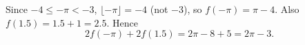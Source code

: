 Since $-4\le-\pi<-3$, $\lfloor-\pi\rfloor=-4$ (not $-3$), so $f(-\pi)=\pi-4$. Also $f(1.5)=1.5+1=2.5$. Hence
\[
2f(-\pi)+2f(1.5)=2\pi-8+5=\boxed{2\pi-3}.
\]
